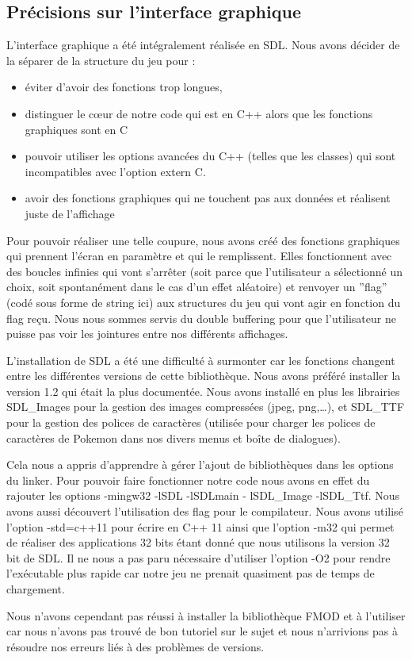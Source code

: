 \subsection{Précisions sur l'interface graphique}
L'interface graphique a été intégralement réalisée en SDL. Nous avons décider de la séparer de la structure du jeu pour :
\begin{itemize}
\item éviter d'avoir des fonctions trop longues,
\item  distinguer le cœur de notre code qui est en C++ alors que les fonctions graphiques sont en C
\item pouvoir utiliser les options avancées du C++ (telles que les classes) qui sont incompatibles avec l'option extern C. 
\item avoir des fonctions graphiques qui ne touchent pas aux données et réalisent juste de l'affichage
\end{itemize}
Pour pouvoir réaliser une telle coupure, nous avons créé des fonctions graphiques qui prennent l'écran en paramètre et qui le remplissent. Elles fonctionnent avec des boucles infinies qui vont s’arrêter (soit parce que l'utilisateur a sélectionné un choix, soit spontanément dans le cas d'un effet aléatoire) et renvoyer un ''flag'' (codé sous forme de string ici) aux structures du jeu qui vont agir en fonction du flag reçu. Nous nous sommes servis du double buffering pour que l'utilisateur ne puisse pas voir les jointures entre nos différents affichages. 

L'installation de SDL a été une difficulté à surmonter car les fonctions changent entre les différentes versions de cette bibliothèque. Nous avons préféré installer la version 1.2 qui était la plus documentée. Nous avons installé en plus les librairies SDL\_Images pour la gestion des images compressées (jpeg, png,\dots), et SDL\_TTF pour la gestion des polices de caractères (utilisée pour charger les polices de caractères de Pokemon dans nos divers menus et boîte de dialogues). 

Cela nous a appris d'apprendre à gérer l'ajout de bibliothèques dans les options du linker. Pour pouvoir faire fonctionner notre code nous avons en effet du rajouter les options  -mingw32 -lSDL -lSDLmain - lSDL\_Image -lSDL\_Ttf. Nous avons aussi découvert l'utilisation des flag pour le compilateur. Nous avons utilisé l'option -std=c++11 pour écrire en C++ 11 ainsi que l'option -m32 qui permet de réaliser des applications 32 bits étant donné que nous utilisons la version 32 bit de SDL. Il ne nous a pas paru nécessaire d'utiliser l'option -O2 pour rendre l’exécutable plus rapide car notre jeu ne prenait quasiment pas de temps de chargement. 

Nous n'avons cependant pas réussi à installer la bibliothèque FMOD et à l'utiliser car nous n'avons pas trouvé de bon tutoriel sur le sujet et nous n'arrivions pas à résoudre nos erreurs liés à des problèmes de versions. 
